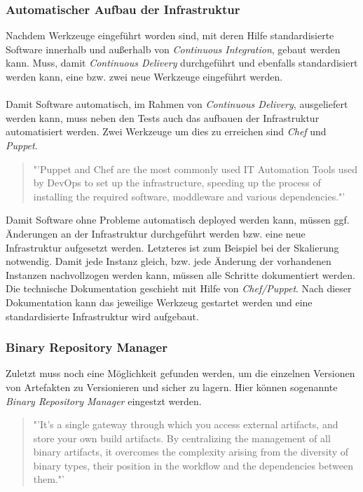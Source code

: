 \subsubsection*{Automatischer Aufbau der Infrastruktur}
Nachdem Werkzeuge eingeführt worden sind, mit deren Hilfe standardisierte Software innerhalb und außerhalb von \textit{Continuous Integration}, gebaut werden kann. Muss, damit \textit{Continuous Delivery} durchgeführt und ebenfalls standardisiert werden kann, eine bzw. zwei neue Werkzeuge eingeführt werden.
\\\\
Damit Software automatisch, im Rahmen von \textit{Continuous Delivery}, ausgeliefert werden kann, muss neben den Tests auch das aufbauen der Infrastruktur automatisiert werden. Zwei Werkzeuge um dies zu erreichen sind \textit{Chef} und \textit{Puppet}.
\begin{quote}
	"'Puppet and Chef are the most commonly used IT Automation Tools used by DevOps to set up the infrastructure, speeding up the process of installing the required software, moddleware and various dependencies."'\cite{IEEE:CDMitJenkins}
\end{quote}
Damit Software ohne Probleme automatisch deployed werden kann, müssen ggf. Änderungen an der Infrastruktur durchgeführt werden bzw. eine neue Infrastruktur aufgesetzt werden. Letzteres ist zum Beispiel bei der Skalierung notwendig. Damit jede Instanz gleich, bzw. jede Änderung der vorhandenen Instanzen nachvollzogen werden kann, müssen alle Schritte dokumentiert werden. Die technische Dokumentation geschieht mit Hilfe von \textit{Chef/Puppet}. Nach dieser Dokumentation kann das jeweilige Werkzeug gestartet werden und eine standardisierte Infrastruktur wird aufgebaut.

\subsubsection*{Binary Repository Manager}
Zuletzt muss noch eine Möglichkeit gefunden werden, um die einzelnen Versionen von Artefakten zu Versionieren und sicher zu lagern. Hier können sogenannte \textit{Binary Repository Manager} eingestzt werden.

\begin{quote}
    "'It’s a single gateway through which you access external artifacts, and store your own build artifacts. By centralizing the management of all binary artifacts, it overcomes the complexity arising from the diversity of binary types, their position in the workflow and the dependencies between them."'\cite{BRM}
\end{quote}

